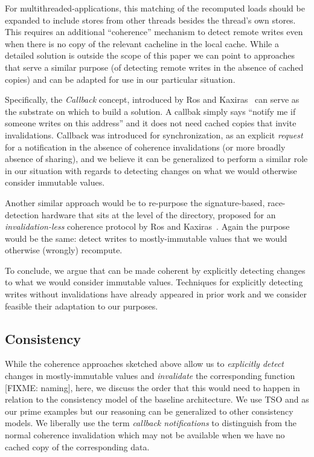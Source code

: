 For multithreaded-applications, this matching of the recomputed loads should be expanded to include stores from other threads besides the thread's own stores. This requires an additional ``coherence'' mechanism to detect remote writes even when there is no copy of the relevant cacheline in the local cache. While a detailed solution is outside the scope of this paper we can point to approaches that serve a similar purpose (of detecting remote writes in the absence of cached copies) and can be adapted for use in our particular situation. 

Specifically, the \emph{Callback} concept, introduced by Ros and Kaxiras~\cite{aros-isca15} can serve as the substrate on which to build a solution. A callbak simply says ``notify me if someone writes on this address'' and it does not need cached copies that invite invalidations. Callback was introduced for synchronization, as an explicit \emph{request} for a notification in the absence of coherence invalidations (or more broadly absence of sharing), and we believe it can be generalized to perform a similar role in our situation with regards to detecting changes on what we would otherwise consider immutable values. 

Another similar approach would be to re-purpose the signature-based, race-detection hardware that sits at the level of the directory, proposed for an \emph{invalidation-less} coherence protocol by Ros and Kaxiras~\cite{aros-micro16}. Again the purpose would be the same: detect writes to mostly-immutable values that we would otherwise (wrongly) recompute.

To conclude, we argue that {\recomp} can be made coherent by explicitly detecting changes to what we would consider immutable values. Techniques for explicitly detecting writes without invalidations have already appeared in prior work and we consider feasible their adaptation to our purposes.

\subsection{Consistency}
\label{sec:consistency}
While the coherence approaches sketched above allow us to \emph{explicitly detect} changes in mostly-immutable values and \emph{invalidate} the corresponding {\recomp} function {\color{red} [FIXME: naming]}, here, we discuss the order that this would need to happen in relation to the consistency model of the baseline architecture.
We use TSO and {\rc} as our prime examples but our reasoning can be generalized to other consistency models. We liberally use the term \emph{callback notifications} to distinguish from the normal coherence invalidation which may not be available when we have no cached copy of the corresponding data.

